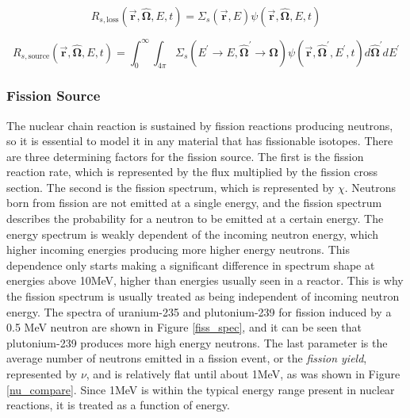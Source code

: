 \begin{equation}
\label{scattering_loss}
R_{s, \mathrm{loss}}( \boldsymbol{\vec{r}},\boldsymbol{\hat{\Omega}},E,t ) = \Sigma_s (\boldsymbol{\vec{r}},E) \psi(\boldsymbol{\vec{r}},\boldsymbol{\hat{\Omega}},E,t)
 \end{equation}
 
 \begin{equation}
\label{scattering_source}
R_{s, \mathrm{source}}(\boldsymbol{\vec{r}},\boldsymbol{\hat{\Omega}},E,t) = \int_0^\infty  \int_{4\pi} \Sigma_s(E^\prime \rightarrow E,\boldsymbol{\hat{\Omega}}^\prime \rightarrow \boldsymbol{\hat{\Omega}}) \psi(\boldsymbol{\vec{r}},\boldsymbol{\hat{\Omega}}^\prime,E^\prime,t) d\boldsymbol{\hat{\Omega}}^\prime dE^\prime
 \end{equation}
 
 \subsubsection{Fission Source}

The nuclear chain reaction is sustained by fission reactions producing neutrons, so it is essential to model it in any material that has fissionable isotopes.  There are three determining factors for the fission source.  The first is the fission reaction rate, which is represented by the flux multiplied by the fission cross section.  The second is the fission spectrum, which is represented by $\chi$.  Neutrons born from fission are not emitted at a single energy, and the fission spectrum describes the probability for a neutron to be emitted at a certain energy.  The energy spectrum is weakly dependent of the incoming neutron energy, which higher incoming energies producing more higher energy neutrons.  This dependence only starts making a significant difference in spectrum shape at energies above 10MeV, higher than energies usually seen in a reactor.  This is why the fission spectrum is usually treated as being independent of incoming neutron energy.  The spectra of uranium-235 and plutonium-239 for fission induced by a 0.5 MeV neutron are shown in Figure \ref{fiss_spec}, and it can be seen that plutonium-239 produces more high energy neutrons.  The last parameter is the average number of neutrons emitted in a fission event, or the \emph{fission yield}, represented by $\nu$, and is relatively flat until about 1MeV, as was shown in Figure \ref{nu_compare}.  Since 1MeV is within the typical energy range present in nuclear reactions, it is treated as a function of energy.

